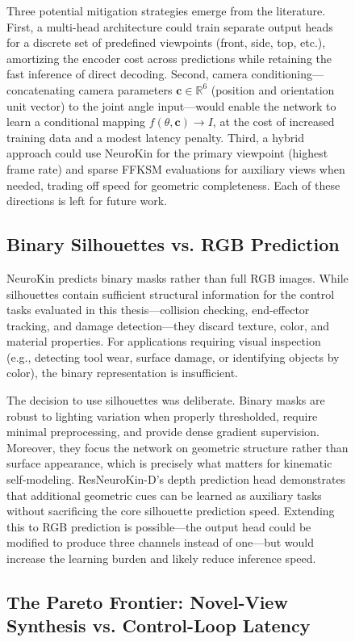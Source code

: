 \documentclass[12pt,a4paper,oneside]{report}
\begin{document}
\begin{figure}[H]
Three potential mitigation strategies emerge from the literature. First, a multi-head architecture could train separate output heads for a discrete set of predefined viewpoints (front, side, top, etc.), amortizing the encoder cost across predictions while retaining the fast inference of direct decoding. Second, camera conditioning---concatenating camera parameters $\mathbf{c} \in \mathbb{R}^6$ (position and orientation unit vector) to the joint angle input---would enable the network to learn a conditional mapping $f(\theta, \mathbf{c}) \rightarrow I$, at the cost of increased training data and a modest latency penalty. Third, a hybrid approach could use NeuroKin for the primary viewpoint (highest frame rate) and sparse FFKSM evaluations for auxiliary views when needed, trading off speed for geometric completeness. Each of these directions is left for future work.

\subsection{Binary Silhouettes vs. RGB Prediction}

NeuroKin predicts binary masks rather than full RGB images. While silhouettes contain sufficient structural information for the control tasks evaluated in this thesis---collision checking, end-effector tracking, and damage detection---they discard texture, color, and material properties. For applications requiring visual inspection (e.g., detecting tool wear, surface damage, or identifying objects by color), the binary representation is insufficient.

The decision to use silhouettes was deliberate. Binary masks are robust to lighting variation when properly thresholded, require minimal preprocessing, and provide dense gradient supervision. Moreover, they focus the network on geometric structure rather than surface appearance, which is precisely what matters for kinematic self-modeling. ResNeuroKin-D's depth prediction head demonstrates that additional geometric cues can be learned as auxiliary tasks without sacrificing the core silhouette prediction speed. Extending this to RGB prediction is possible---the output head could be modified to produce three channels instead of one---but would increase the learning burden and likely reduce inference speed.

\subsection{The Pareto Frontier: Novel-View Synthesis vs. Control-Loop Latency}


\end{figure}
\end{document}
